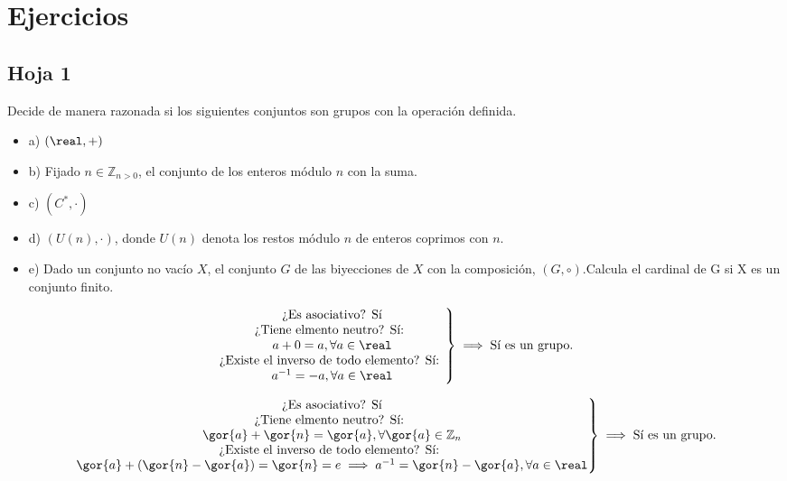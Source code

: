 \section{Ejercicios}
\subsection{Hoja 1}
\begin{problem}[1]
 Decide de manera razonada si los siguientes conjuntos son grupos con la operación definida.
 
 \begin{itemize}
  \item a) $(\real,+)$
  \item b) Fijado $n \in \mathbb{Z}_{n>0}$, el conjunto de los enteros módulo $n$ con la suma.
  \item c) $(C^*,\cdot)$
  \item d) $(U (n), ·)$, donde $U (n)$ denota los restos módulo $n$ de enteros coprimos con $n$.
  \item e) Dado un conjunto no vacío $X$, el conjunto $G$ de las biyecciones de $X$ con la composición, $(G, \circ)$.Calcula el cardinal de G si X es un conjunto finito.
 \end{itemize}

 \solution

\spart
$$\left. \begin{matrix}
\text{¿Es asociativo? Sí}\\
\text{¿Tiene elmento neutro? Sí: } \\a + 0 = a, \forall a \in \real\\
\text{¿Existe el inverso de todo elemento? Sí: } \\a^{-1} = -a, \forall a \in \real
\end{matrix}\right\} \implies \text{Sí es un grupo.}$$

\spart
$$\left. \begin{matrix}
\text{¿Es asociativo? Sí}\\
\text{¿Tiene elmento neutro? Sí: } \\\gor{a} + \gor{n} = \gor{a}, \forall \gor{a} \in \mathbb{Z}_n\\
\text{¿Existe el inverso de todo elemento? Sí: } \\ \gor{a} + (\gor{n} - \gor{a}) = \gor{n} = e \implies a^{-1} = \gor{n} - \gor{a}, \forall a \in \real
\end{matrix}\right\} \implies \text{Sí es un grupo.}$$

\end{problem}

